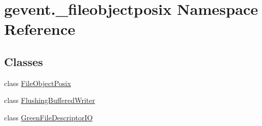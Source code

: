 \hypertarget{namespacegevent_1_1__fileobjectposix}{}\section{gevent.\+\_\+fileobjectposix Namespace Reference}
\label{namespacegevent_1_1__fileobjectposix}
\subsection*{Classes}
\begin{DoxyCompactItemize}
\item 
class \hyperlink{classgevent_1_1__fileobjectposix_1_1_file_object_posix}{File\+Object\+Posix}
\item 
class \hyperlink{classgevent_1_1__fileobjectposix_1_1_flushing_buffered_writer}{Flushing\+Buffered\+Writer}
\item 
class \hyperlink{classgevent_1_1__fileobjectposix_1_1_green_file_descriptor_i_o}{Green\+File\+Descriptor\+IO}
\end{DoxyCompactItemize}
